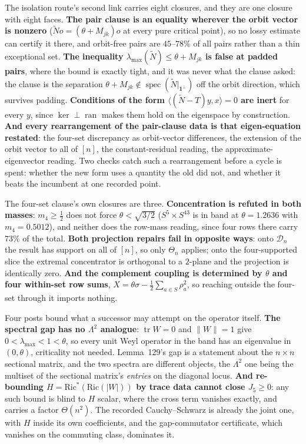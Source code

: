 The isolation route's second link carries eight closures, and they are one closure with eight faces. \textbf{The pair clause is an equality wherever the orbit vector is nonzero} ($\widetilde N o=(\theta+M_{jk})o$ at every pure critical point), so no lossy estimate can certify it there, and orbit-free pairs are $45$--$78\%$ of all pairs rather than a thin exceptional set. \textbf{The inequality $\lambda_{\max}(\widetilde N)\le\theta+M_{jk}$ is false at padded pairs}, where the bound is exactly tight, and it was never what the clause asked: the clause is the separation $\theta+M_{jk}\notin\operatorname{spec}(\widetilde N|_{\mathbf1^\perp})$ off the orbit direction, which survives padding. \textbf{Conditions of the form $\langle(\widetilde N-T)y,x\rangle=0$ are inert} for every $y$, since $\ker\perp\operatorname{ran}$ makes them hold on the eigenspace by construction. \textbf{And every rearrangement of the pair-clause data is that eigen-equation restated}: the four-set discrepancy as orbit-vector differences, the extension of the orbit vector to all of $[n]$, the constant-residual reading, the approximate-eigenvector reading. Two checks catch such a rearrangement before a cycle is spent: whether the new form uses a quantity the old did not, and whether it beats the incumbent at one recorded point.

The four-set clause's own closures are three. \textbf{Concentration is refuted in both masses}: $m_4\ge\tfrac12$ does not force $\theta<\sqrt{3/2}$ ($S^5\times S^{43}$ is in band at $\theta=1.2636$ with $m_4=0.5012$), and neither does the row-mass reading, since four rows there carry $73\%$ of the total. \textbf{Both projection repairs fail in opposite ways}: onto $\mathcal D_n$ the result has support on all of $[n]$, so only $\Theta_n$ applies; onto the four-supported slice the extremal concentrator is orthogonal to a $2$-plane and the projection is identically zero. \textbf{And the complement coupling is determined by $\theta$ and four within-set row sums}, $X=\theta\sigma-\tfrac12\sum_{a\in S}\rho_a^2$, so reaching outside the four-set through it imports nothing.

Four posts bound what a successor may attempt on the operator itself. \textbf{The spectral gap has no $\Lambda^2$ analogue}: $\operatorname{tr}W=0$ and $\|W\|=1$ give $0<\lambda_{\max}<1<\theta$, so every unit Weyl operator in the band has an eigenvalue in $(0,\theta)$, criticality not needed. Lemma~129's gap is a statement about the $n\times n$ sectional matrix, and the two spectra are different objects, the $\Lambda^2$ one being the multiset of the sectional matrix's \emph{entries} on the diagonal locus. \textbf{And re-bounding $H=\mathrm{Ric}^*(\mathrm{Ric}(|W|))$ by trace data cannot close $J_5\ge0$}: any such bound is blind to $H$ scalar, where the cross term vanishes exactly, and carries a factor $\Theta(n^2)$. The recorded Cauchy--Schwarz is already the joint one, with $H$ inside its own coefficients, and the gap-commutator certificate, which vanishes on the commuting class, dominates it.

